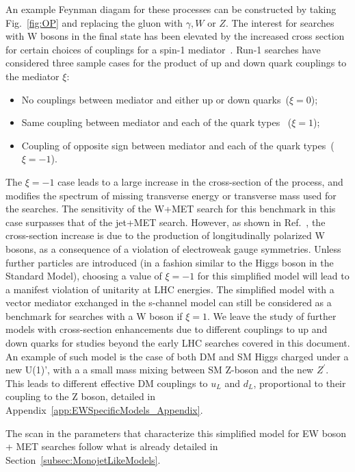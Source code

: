 An example Feynman diagam for these processes can be constructed by taking
Fig.~\ref{fig:OP} and replacing the gluon with $\gamma,W$ or $Z$.
The interest for searches with W bosons in the final state
has been elevated by the increased cross section
for certain choices of couplings for a spin-1 mediator~\cite{Bai:2012xg}.
Run-1 searches have considered three sample cases for the product of
up and down quark couplings to the mediator $\xi$:
\begin{itemize}
 \item No couplings between mediator and either up or down quarks~($\xi=0$);
 \item Same coupling between mediator and each of the quark types~ ($\xi=1$);
 \item Coupling of opposite sign between mediator and each of the quark types~($\xi=-1$).
\end{itemize}
The $\xi=-1$ case leads to a large increase in the cross-section of the process,
and modifies the spectrum of missing transverse energy or
transverse mass used for the searches. The sensitivity of the W+MET search for
this benchmark in this case surpasses that of the jet+MET search.
However, as shown in Ref.~\cite{Bell:2015sza}, the cross-section increase is due
to the production of longitudinally polarized W bosons,
as a consequence of a violation of electroweak gauge symmetries. Unless further
particles are introduced (in a fashion similar
to the Higgs boson in the Standard Model), choosing a value of $\xi=-1$
for this simplified model will lead to a manifest violation of unitarity at LHC energies.
The simplified model with a vector mediator exchanged in the s-channel model
can still be considered as a benchmark for searches with a W boson if $\xi=1$.
We leave the study of further models with cross-section enhancements due
to different couplings to up and down quarks for studies beyond the early LHC searches
covered in this document.
An example of such model is the case of both DM and SM Higgs charged under a new U(1)',
with a a small mass mixing between SM Z-boson and the new $Z^\prime$. This leads
to different effective DM couplings to $u_L$ and $d_L$, proportional to
their coupling to the Z boson, detailed in Appendix~\ref{app:EWSpecificModels_Appendix}.

The scan in the parameters that characterize this simplified model for EW boson + MET
searches follow what is
already detailed in Section~\ref{subsec:MonojetLikeModels}.

